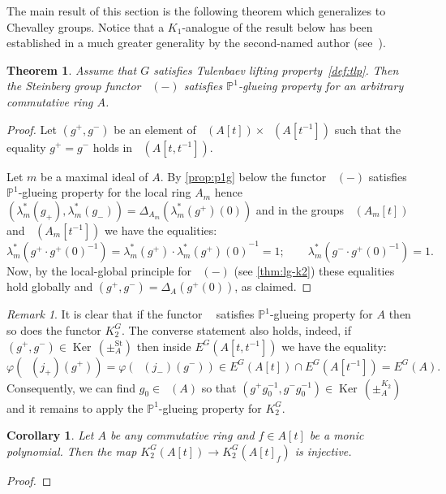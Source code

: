 \documentclass[oneside,12pt]{amsart}
\newtheorem{thm}{Theorem}
\numberwithin{equation}{section}
\numberwithin{lem}{section}
\newtheorem{cor}[lem]{Corollary}
\theoremstyle{definition}
\theoremstyle{remark}
\newtheorem{rem}[lem]{Remark}
\DeclareMathOperator{\St}{St^G}
\DeclareMathOperator{\Bigker}{Ker\,}
\newcommand{\Stb}{\mathrm{St}}
\newcommand{\Pro}{\mathbb{P}}
\begin{document}
The main result of this section is the following theorem which generalizes \cite[Theorem~5.1]{Tu} to Chevalley groups.
Notice that a $K_1$-analogue of the result below has been established in a much greater generality by the second-named author (see~\cite[Theorem~1.1]{St-poly}).
\begin{thm} \label{thm:p1} Assume that $G$ satisfies Tulenbaev lifting property~\ref{def:tlp}.
Then the Steinberg group functor $\St(-)$ satisfies $\Pro^1$-glueing property for an arbitrary commutative ring $A$. \end{thm}
\begin{proof}
 Let $(g^+, g^-)$ be an element of $\St(A[t]) \times \St(A[t^{-1}])$ such that the equality $g^+ = g^-$ holds in $\St(A[t, t^{-1}])$.

 Let $m$ be a maximal ideal of $A$.
 By \cref{prop:p1g} below the functor $\St(-)$ satisfies $\Pro^1$-glueing property for the local ring $A_m$ hence
 $(\lambda_m^*(g_+), \lambda_m^*(g_-)) = \Delta_{A_m}(\lambda_m^*(g^+)(0))$ and in the groups $\St(A_m[t])$ and $\St(A_m[t^{-1}])$ we have the equalities:
 $$\lambda_m^*(g^+ \cdot g^+(0)^{-1}) = \lambda_m^*(g^+) \cdot {\lambda_m^*(g^+)(0)}^{-1} = 1; \qquad \lambda_m^*(g^-\cdot g^+(0)^{-1}) =1. $$
 Now, by the local-global principle for $\St(-)$ (see \cref{thm:lg-k2}) these equalities hold globally and $(g^+, g^-) = \Delta_A(g^+(0))$, as claimed.
\end{proof}

\begin{rem} \label{rem:stk2} It is clear that if the functor $\St$ satisfies $\Pro^1$-glueing property for $A$ then so does the functor $K_2^G$.
 The converse statement also holds, indeed, if $(g^+, g^-)\in\Bigker(\pm^{\Stb}_A)$ then inside $E^G(A[t, t^{-1}])$ we have the equality:
 $$\varphi(\St(j_+)(g^+)) = \varphi(\St(j_-)(g^-)) \in E^G(A[t]) \cap E^G(A[t^{-1}]) = E^G(A).$$
 Consequently, we can find $g_0 \in \St(A)$ so that $(g^+ g_0^{-1}, g^- g_0^{-1}) \in \Bigker(\pm_A^{K_2})$ and
 it remains to apply the $\Pro^1$-glueing property for $K_2^G$. \end{rem}

\begin{cor} Let $A$ be any commutative ring and $f\in A[t]$ be a monic polynomial.
Then the map $K_2^G(A[t])\to K_2^G(A[t]_f)$ is injective. \end{cor}
\begin{proof}
\end{proof}
\end{document}
